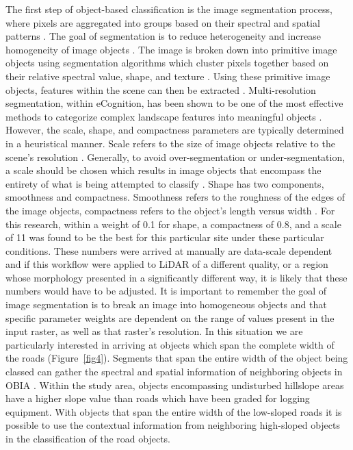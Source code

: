 \documentclass[remotesensing,article,submit,pdftex,moreauthors]{Definitions/mdpi}
\begin{document}
The first step of object-based classification is the image segmentation process, where pixels are aggregated into groups based on their spectral and spatial patterns \cite{alon}. The goal of segmentation is to reduce heterogeneity and increase homogeneity of image objects \cite{naggar}. The image is broken down into primitive image objects using segmentation algorithms which cluster pixels together based on their relative spectral value, shape, and texture \cite{xu}. Using these primitive image objects, features within the scene can then be extracted \cite{naggar, xu}. Multi-resolution segmentation, within eCognition, has been shown to be one of the most effective methods to categorize complex landscape features into meaningful objects \cite{carreira, naggar, tab}. However, the scale, shape, and compactness parameters are typically determined in a heuristical manner. Scale refers to the size of image objects relative to the scene’s resolution \cite{duan, naggar}. Generally, to avoid over-segmentation or under-segmentation, a scale should be chosen which results in image objects that encompass the entirety of what is being attempted to classify \cite{duan, sherba}. Shape has two components, smoothness and compactness. Smoothness refers to the roughness of the edges of the image objects, compactness refers to the object’s length versus width \cite{naggar}. For this research, within a weight of 0.1 for shape, a compactness of 0.8, and a scale of 11 was found to be the best for this particular site under these particular conditions. These numbers were arrived at manually are data-scale dependent and if this workflow were applied to LiDAR of a different quality, or a region whose morphology presented in a significantly different way, it is likely that these numbers would have to be adjusted. It is important to remember the goal of image segmentation is to break an image into homogeneous objects and that specific parameter weights are dependent on the range of values present in the input raster, as well as that raster’s resolution. In this situation we are particularly interested in arriving at objects which span the complete width of the roads (Figure~\ref{fig4}). Segments that span the entire width of the object being classed can gather the spectral and spatial information of neighboring objects in OBIA \cite{duan, sherba, xu}. Within the study area, objects encompassing undisturbed hillslope areas have a higher slope value than roads which have been graded for logging equipment. With objects that span the entire width of the low-sloped roads it is possible to use the contextual information from neighboring high-sloped objects in the classification of the road objects. 
\end{document}
